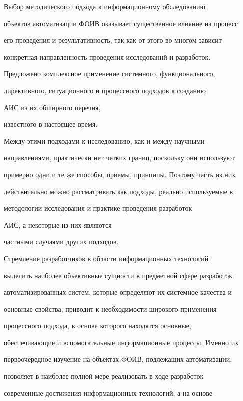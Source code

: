        


      Выбор методического подхода к информационному обследованию 


объектов автоматизации ФОИВ оказывает существенное влияние на процесс 


его проведения и результативность, так как от этого во многом зависит 


конкретная направленность проведения исследований и разработок. 


Предложено комплексное применение системного, функционального, 


директивного, ситуационного и процессного подходов к созданию 


АИС из их обширного перечня, 


известного в настоящее время.


      


      Между этими подходами к исследованию, как и между научными 


направлениями, практически нет четких границ, поскольку они используют 


примерно одни и те же способы, приемы, принципы. Поэтому часть из них 


действительно можно рассматривать как подходы, реально используемые в 


методологии исследования и практике проведения разработок 


АИС, а некоторые из них являются 


частными случаями других подходов. 


      


      Стремление разработчиков в области информационных технологий 


выделить наиболее объективные сущности в предметной сфере разработок 


автоматизированных систем, которые определяют их системное качества и 


основные свойства, приводит к необходимости широкого применения 


процессного подхода, в основе которого находятся основные, 


обеспечивающие и вспомогательные информационные процессы. Именно их 


первоочередное изучение на объектах ФОИВ, подлежащих автоматизации, 


позволяет в наиболее полной мере реализовать в ходе разработок 


современные достижения информационных технологий, а на основе 


